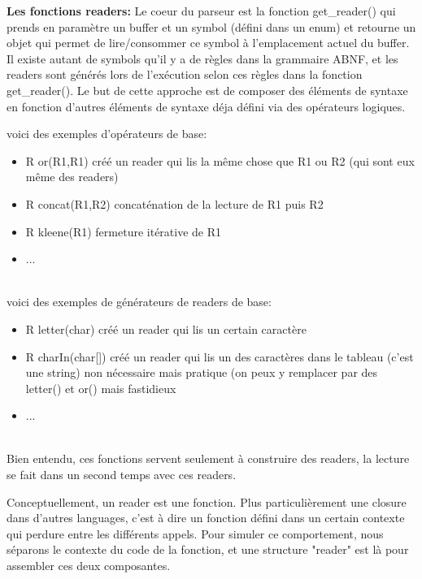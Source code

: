 \documentclass{article}
\begin{document}
            \textbf{\large{Les fonctions readers:}}
            Le coeur du parseur est la fonction get\_reader() qui prends en paramètre un buffer et un symbol (défini dans un enum) et retourne un objet qui permet de lire/consommer ce symbol à l'emplacement actuel du buffer.
            Il existe autant de symbols qu'il y a de règles dans la grammaire ABNF, et les readers sont générés lors de l'exécution selon ces règles dans la fonction get\_reader().
            Le but de cette approche est de composer des éléments de syntaxe en fonction d'autres éléments de syntaxe déja défini via des opérateurs logiques.
            
            voici des exemples d'opérateurs de base:\\
            \begin{itemize}
                \item R or(R1,R1) créé un reader qui lis la même chose que R1 ou R2 (qui sont eux même des readers)
                \item R concat(R1,R2) concaténation de la lecture de R1 puis R2
                \item R kleene(R1) fermeture itérative de R1
                \item ...
            \end{itemize}
            ~~\\
            voici des exemples de générateurs de readers de base:\\
            \begin{itemize}
                \item R letter(char) créé un reader qui lis un certain caractère
                \item R charIn(char[]) créé un reader qui lis un des caractères dans le tableau (c'est une string) non nécessaire mais pratique (on peux y remplacer par des letter() et or() mais fastidieux
                \item ...
            \end{itemize}
                ~~\\
            Bien entendu, ces fonctions servent seulement à construire des readers, la lecture se fait dans un second temps avec ces readers.
            
            Conceptuellement, un reader est une fonction. Plus particulièrement une closure dans d'autres languages, c'est à dire un fonction défini dans un certain contexte qui perdure entre les différents appels.
            Pour simuler ce comportement, nous séparons le contexte du code de la fonction, et une structure "reader" est là pour assembler ces deux composantes.
            
\end{document}
